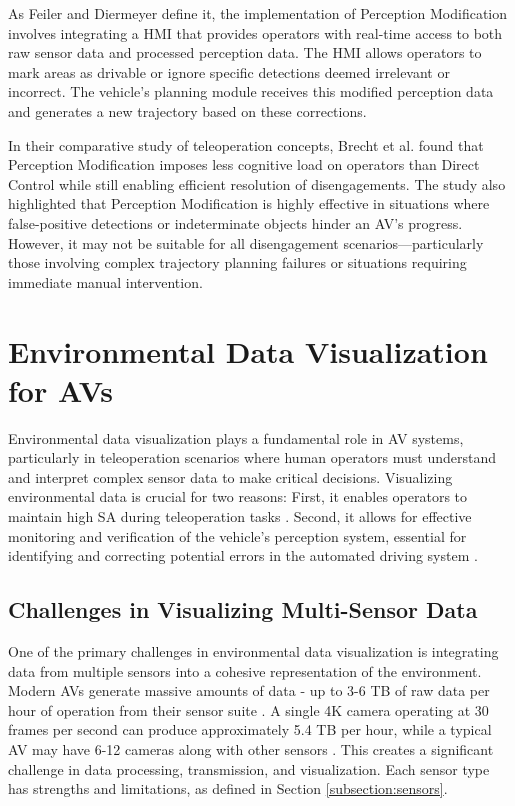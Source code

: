 As Feiler and Diermeyer \cite{Feiler2021ThePM} define it, the implementation of
Perception Modification involves integrating a  \ac{HMI} that provides operators with real-time access to both raw sensor data and processed perception data. The HMI allows operators to
mark areas as drivable or ignore specific detections deemed irrelevant or incorrect. The vehicle's planning module receives this modified perception data and generates a new trajectory based on these corrections.

In their comparative study of teleoperation concepts, Brecht et al. \cite{Brecht} found
that Perception Modification imposes less cognitive load on operators than
Direct Control while still enabling efficient resolution of disengagements.
The study also highlighted that Perception Modification is highly effective in
situations where false-positive detections or indeterminate objects hinder an AV's progress.
However, it may not be suitable for all disengagement scenarios—particularly those
involving complex trajectory planning failures or situations requiring immediate manual intervention.

\clearpage

\section{Environmental Data Visualization for \acp{AV}}
Environmental data visualization plays a fundamental role in \ac{AV} systems,
particularly in teleoperation scenarios where human operators must understand and interpret
complex sensor data to make critical decisions.
Visualizing environmental data is crucial for two reasons: First, it enables operators to
maintain high \ac{SA} during
teleoperation tasks \cite{Gnatzig}. Second, it allows for effective monitoring and verification
of the vehicle's perception system, essential for identifying and correcting potential errors
in the automated driving system \cite{Feiler2021ThePM}.

\subsection{Challenges in Visualizing Multi-Sensor Data}\label{subsection:challengesmultisensor}
One of the primary challenges in environmental data visualization is integrating data from multiple
sensors into a cohesive representation of the environment. Modern \acp{AV} generate
massive amounts of data - up to 3-6 TB of raw data per hour of operation from their sensor suite \cite{kazhamiaka2021challenges}
. A single 4K camera operating at 30 frames per second can produce
approximately 5.4 TB per hour, while a typical AV may have 6-12 cameras along with other sensors \cite{visualcapitalist2024}
. This creates a significant challenge in data processing, transmission,
and visualization. Each sensor type has strengths and limitations, as defined in Section \ref{subsection:sensors}.

